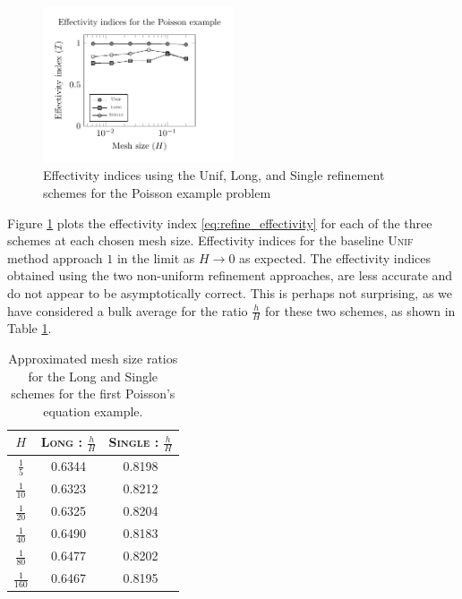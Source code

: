 \begin{figure}[ht!]
\centering
\includegraphics[width=0.5\textwidth]{img/refine_poisson_effectivity}
\caption{Effectivity indices using the Unif,
Long, and Single refinement schemes for
the Poisson example problem}
\label{fig:refine_poisson_effectivity}
\end{figure}

Figure \ref{fig:refine_poisson_effectivity} plots
the effectivity index \eqref{eq:refine_effectivity}
for each of the three schemes at each chosen
mesh size. Effectivity indices for the
baseline \textsc{Unif} method approach
$1$ in the limit as $H \to 0$ as expected. The effectivity
indices obtained using the two non-uniform refinement approaches,
are less accurate
and do not appear to be asymptotically correct.
This is perhaps not surprising, as we have considered a bulk
average for the ratio $\frac{h}{H}$ for these two schemes,
as shown in Table \ref{tab:refine_poisson_ratios}.

%
\begin{table}[ht!]
\centering
\begin{tabular}{ | c | c | c | } \hline
$H$ & \textsc{Long} : $\frac{h}{H}$ & \textsc{Single} : $\frac{h}{H}$ \\ \hline \hline
$\frac{1}{5}$ & 0.6344 & 0.8198 \\ \hline
$\frac{1}{10}$ & 0.6323 & 0.8212 \\ \hline
$\frac{1}{20}$ & 0.6325 & 0.8204 \\ \hline
$\frac{1}{40}$ & 0.6490 & 0.8183 \\ \hline
$\frac{1}{80}$ & 0.6477 & 0.8202 \\ \hline
$\frac{1}{160}$ & 0.6467 & 0.8195 \\ \hline
\end{tabular}
\caption{Approximated mesh size ratios for the Long and
Single schemes for the first Poisson's equation example.}
\label{tab:refine_poisson_ratios}
\end{table}

